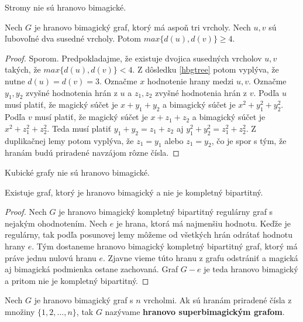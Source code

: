 \begin{subconsequence}
\label{hbgtree} 
Stromy nie sú hranovo bimagické.
\end{subconsequence}

\begin{subtheorem} Nech $G$ je hranovo bimagický graf, ktorý má aspoň tri vrcholy. Nech $u,v$ sú ľubovoľné dva susedné vrcholy. Potom $max \{d(u), d(v)\} \geq 4$.
\end{subtheorem}

\begin{proof} Sporom. Predpokladajme, že existuje dvojica susedných vrcholov $u,v$ takých, že $max \{d(u), d(v)\} < 4$. Z dôsledku \ref{hbgtree}  potom vyplýva, že nutne $d(u) = d(v) = 3$. Označme $x$ hodnotenie hrany medzi $u,v$. Označme $y_1, y_2$ zvyšné hodnotenia hrán z $u$ a $z_1, z_2$ zvyšné hodnotenia hrán z $v$. Podľa $u$ musí platiť, že magický súčet je $x + y_1 + y_2$ a bimagický súčet je $x^2 + y^2_1 + y^2_2$. Podľa $v$ musí platiť, že magický súčet je $x + z_1 + z_2$ a bimagický súčet je $x^2 + z^2_1 + z^2_2$. Teda musí platiť $y_1 + y_2 = z_1 + z_2$ aj $y^2_1 + y^2_2 = z^2_1 + z^2_2$. Z duplikačnej lemy potom vyplýva, že $z_1 = y_1$ alebo $z_1 = y_2$, čo je spor s tým, že hranám budú priradené navzájom rôzne čísla.
\end{proof} 

\begin{subconsequence} Kubické grafy nie sú hranovo bimagické.
\end{subconsequence}

\begin{subtheorem} Existuje graf, ktorý je hranovo bimagický a nie je kompletný bipartitný.
\end{subtheorem}

\begin{proof} Nech $G$ je hranovo bimagický kompletný bipartitný regulárny graf s nejakým ohodnotením. Nech $e$ je hrana, ktorá má najmenšiu hodnotu. Keďže je regulárny, tak podľa posunovej lemy môžeme od všetkých hrán odrátať hodnotu hrany $e$. Tým dostaneme hranovo bimagický kompletný bipartitný graf, ktorý má práve jednu nulovú hranu $e$. Zjavne vieme túto hranu z grafu odstrániť a magická aj bimagická podmienka ostane zachovaná. Graf $G - e$ je teda hranovo bimagický a pritom nie je kompletný bipartitný.
\end{proof}

\begin{subdefinition} Nech $G$ je hranovo bimagický graf s $n$ vrcholmi. Ak sú hranám priradené čísla z množiny $\{1, 2, ... , n\}$, tak $G$ nazývame \textbf{hranovo superbimagickým grafom}.
\end{subdefinition} 

